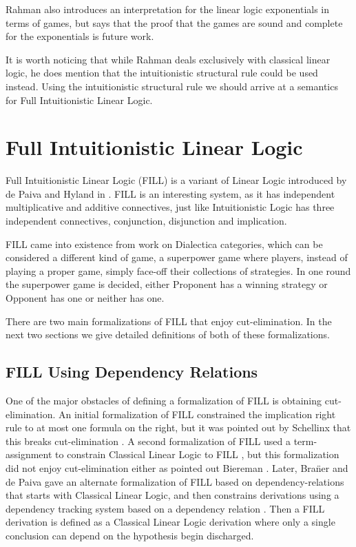 \documentclass{article}
\begin{document}
 
Rahman also introduces an interpretation for the linear logic
exponentials in terms of games, but says that the proof that the games
are sound and complete for the exponentials is future work.
 
It is worth noticing that while Rahman deals exclusively with
classical linear logic, he does mention that the intuitionistic
structural rule could be used instead. Using the intuitionistic
structural rule we should arrive at a semantics for Full
Intuitionistic Linear Logic.
 
\section{Full Intuitionistic Linear Logic}

Full Intuitionistic Linear Logic (FILL) is a variant of Linear Logic
introduced by de Paiva and Hyland in \cite{Hyland:1993}. FILL is an
interesting system, as it has independent multiplicative and additive
connectives, just like Intuitionistic Logic has three independent
connectives, conjunction, disjunction and implication.

FILL came into existence from work on Dialectica categories, which can
be considered a different kind of game, a superpower game where
players, instead of playing a proper game, simply face-off their
collections of strategies. In one round the superpower game is
decided, either Proponent has a winning strategy or Opponent has one
or neither has one.

There are two main formalizations of FILL that enjoy cut-elimination.
In the next two sections we give detailed definitions of both of these
formalizations.

\subsection{FILL Using Dependency Relations}
\label{subsec:fill_using_dependency_relations}
One of the major obstacles of defining a formalization of FILL is
obtaining cut-elimination.  An initial formalization of FILL
constrained the implication right rule to at most one formula on the
right, but it was pointed out by Schellinx that this breaks
cut-elimination \cite{Schellinx:1991}.  A second formalization of FILL
used a term-assignment to constrain Classical Linear Logic to FILL
\cite{Hyland:1993}, but this formalization did not enjoy
cut-elimination either as pointed out Biereman \cite{Bierman:1996a}.
Later, Bra\"ner and de Paiva gave an alternate formalization of FILL
based on dependency-relations that starts with Classical Linear Logic,
and then constrains derivations using a dependency tracking system
based on a dependency relation \cite{Brauner:1998}.  Then a FILL
derivation is defined as a Classical Linear Logic derivation where
only a single conclusion can depend on the hypothesis begin
discharged.
\end{document}
